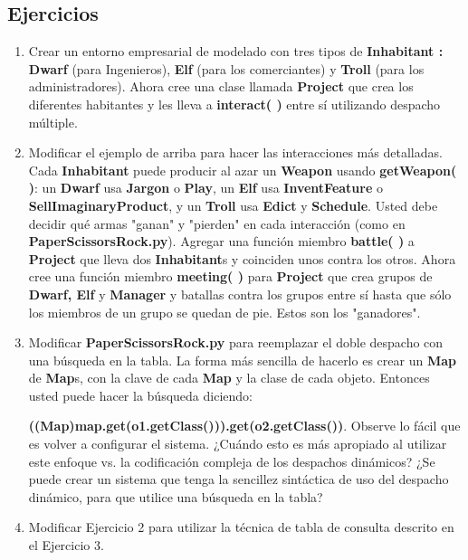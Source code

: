\subsection*{Ejercicios}
\label{subsec:Ejercicios13}

\begin{enumerate}

    \item Crear un entorno empresarial de modelado con tres tipos de \textbf{Inhabitant : Dwarf} (para Ingenieros), \textbf{Elf} (para los comerciantes) y \textbf{Troll} (para los administradores). Ahora cree una clase llamada \textbf{Project} que crea los diferentes habitantes y les lleva a \textbf{interact( )} entre sí utilizando despacho múltiple. 
    
    \item Modificar el ejemplo de arriba para hacer las interacciones más detalladas. Cada \textbf{Inhabitant} puede producir al azar un \textbf{Weapon} usando \textbf{getWeapon( )}: un \textbf{Dwarf} usa \textbf{Jargon} o \textbf{Play}, un \textbf{Elf} usa \textbf{InventFeature} o \textbf{SellImaginaryProduct}, y un \textbf{Troll} usa \textbf{Edict} y \textbf{Schedule}. Usted debe decidir qué armas "ganan" y "pierden" en cada interacción (como en \textbf{PaperScissorsRock.py}). Agregar una función miembro \textbf{battle( )} a \textbf{Project} que lleva dos \textbf{Inhabitant}s y coinciden unos contra los otros. Ahora cree una función miembro \textbf{meeting( )} para \textbf{Project} que crea grupos de \textbf{Dwarf, Elf} y \textbf{Manager} y batallas contra los grupos entre sí hasta que sólo los miembros de un grupo se quedan de pie.  Estos son los "ganadores".
    
    \item Modificar \textbf{PaperScissorsRock.py} para reemplazar el doble despacho con una búsqueda en la tabla. La forma más sencilla de hacerlo es crear un \textbf{Map} de \textbf{Map}s, con la clave de cada \textbf{Map} y la clase de cada objeto. Entonces usted puede hacer la búsqueda diciendo: \par
        \textbf{((Map)map.get(o1.getClass())).get(o2.getClass())}. \newline
    Observe lo fácil que es volver a configurar el sistema. ¿Cuándo esto es más apropiado al utilizar este enfoque vs. la codificación compleja de los despachos dinámicos? ¿Se puede crear un sistema que tenga la sencillez sintáctica de uso del despacho dinámico, para que utilice una búsqueda en la tabla? 
    
    \item Modificar Ejercicio 2 para utilizar la técnica de tabla de consulta descrito en el Ejercicio 3.
    
\end{enumerate}

\newpage
